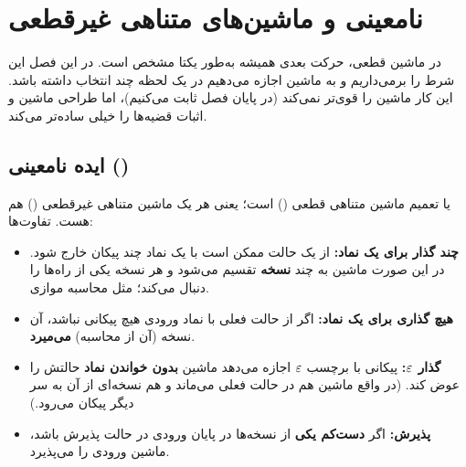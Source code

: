 \chapter{نامعینی و ماشین‌های متناهی غیرقطعی}

در ماشین قطعی، حرکت بعدی همیشه به‌طور یکتا مشخص است. در این فصل این شرط را برمی‌داریم و به ماشین اجازه می‌دهیم در یک لحظه چند انتخاب داشته باشد. این کار ماشین را قوی‌تر نمی‌کند (در پایان فصل ثابت می‌کنیم)، اما طراحی ماشین و اثبات قضیه‌ها را خیلی ساده‌تر می‌کند.

\section{ایده نامعینی ()}

 یا  تعمیم ماشین متناهی قطعی () است؛ یعنی هر  یک ماشین متناهی غیرقطعی () هم هست. تفاوت‌ها:
\begin{itemize}
\item \textbf{چند گذار برای یک نماد:} از یک حالت ممکن است با یک نماد چند پیکان خارج شود. در این صورت ماشین به چند \textbf{نسخه} تقسیم می‌شود و هر نسخه یکی از راه‌ها را دنبال می‌کند؛ مثل محاسبه موازی.
\item \textbf{هیچ گذاری برای یک نماد:} اگر از حالت فعلی با نماد ورودی هیچ پیکانی نباشد، آن نسخه (آن  از محاسبه) \textbf{می‌میرد}.
\item \textbf{گذار $\varepsilon$:} پیکانی با برچسب $\varepsilon$ اجازه می‌دهد ماشین \textbf{بدون خواندن نماد} حالتش را عوض کند. (در واقع ماشین هم در حالت فعلی می‌ماند و هم نسخه‌ای از آن به سر دیگر پیکان می‌رود.)
\item \textbf{پذیرش:} اگر \textbf{دست‌کم یکی} از نسخه‌ها در پایان ورودی در حالت پذیرش باشد، ماشین ورودی را می‌پذیرد.
\end{itemize}

